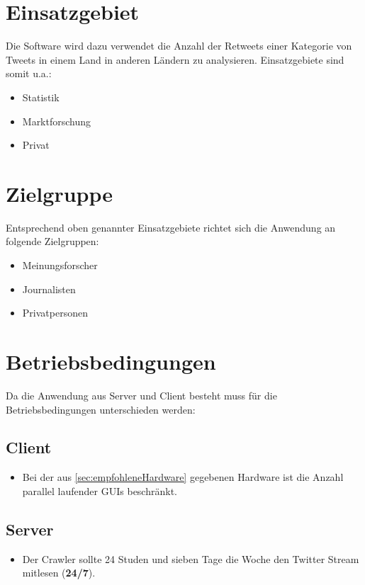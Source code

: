 \section{Einsatzgebiet}
Die Software wird dazu verwendet die Anzahl der Retweets einer Kategorie von Tweets in einem Land in anderen Ländern zu analysieren. Einsatzgebiete sind somit u.a.:
\begin{itemize}
	\item Statistik
	\item Marktforschung
	\item Privat
\end{itemize}
\section{Zielgruppe}
Entsprechend oben genannter Einsatzgebiete richtet sich die Anwendung an folgende Zielgruppen:
\begin{itemize}
	\item Meinungsforscher
	\item Journalisten
	\item Privatpersonen
\end{itemize}
\section{Betriebsbedingungen}
Da die Anwendung aus Server und Client besteht muss für die Betriebsbedingungen unterschieden werden:
\subsection*{Client}
\begin{itemize}
	\item Bei der aus \cref{sec:empfohleneHardware} gegebenen Hardware ist die Anzahl parallel laufender GUIs beschränkt.
\end{itemize}
\subsection*{Server}
\begin{itemize}
	\item Der Crawler sollte 24 Studen und sieben Tage die Woche den Twitter Stream mitlesen (\textbf{24/7}).
\end{itemize}